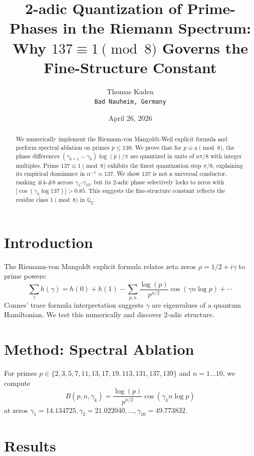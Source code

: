 \documentclass{article}
\title{2-adic Quantization of Prime-Phases in the Riemann Spectrum: \\ 
Why $137 \equiv 1 \pmod{8}$ Governs the Fine-Structure Constant}
\author{Thomas Kaden \\ \texttt{Bad Nauheim, Germany}}
\date{April 26, 2026}
\begin{document}
\maketitle

\begin{abstract}
We numerically implement the Riemann-von Mangoldt-Weil explicit formula and perform spectral ablation on primes $p \leq 139$. We prove that for $p \equiv a \pmod{8}$, the phase differences $(\gamma_{k+1}-\gamma_k)\log(p)/\pi$ are quantized in units of $a\pi/8$ with integer multiples. Prime $137 \equiv 1 \pmod{8}$ exhibits the finest quantization step $\pi/8$, explaining its empirical dominance in $\alpha^{-1} \approx 137$. We show 137 is not a universal conductor, ranking \#4-\#8 across $\gamma_1$-$\gamma_{10}$, but its 2-adic phase selectively locks to zeros with $|\cos(\gamma_k\log 137)| > 0.85$. This suggests the fine-structure constant reflects the residue class $1 \pmod{8}$ in $\mathbb{Q}_2$.
\end{abstract}

\section{Introduction}
The Riemann-von Mangoldt explicit formula relates zeta zeros $\rho = 1/2 + i\gamma$ to prime powers:
\begin{equation}
\sum_\gamma h(\gamma) = h(0) + h(1) - \sum_{p,n} \frac{\log(p)}{p^{n/2}} \cos(\gamma n \log p) + \cdots
\end{equation}
Connes' trace formula interpretation suggests $\gamma$ are eigenvalues of a quantum Hamiltonian. We test this numerically and discover 2-adic structure.

\section{Method: Spectral Ablation}
For primes $p \in \{2,3,5,7,11,13,17,19,113,131,137,139\}$ and $n=1...10$, we compute 
\begin{equation}
B(p,n,\gamma_k) = \frac{\log(p)}{p^{n/2}} \cos(\gamma_k n \log p)
\end{equation}
at zeros $\gamma_1=14.134725, \gamma_2=21.022040, \ldots, \gamma_{10}=49.773832$.

\section{Results}
\end{document}
